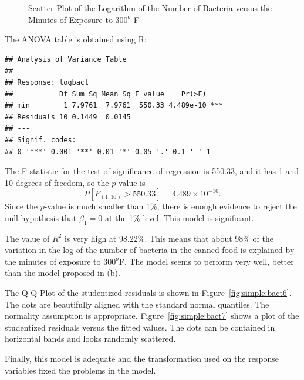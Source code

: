 \begin{solution}{2.22}
\begin{enumerate}
\begin{figure}
\begin{knitrout}
{}



\end{knitrout}
\caption{Scatter Plot of the Logarithm of the Number of Bacteria versus the Minutes of Exposure to $300^{o}$ F}
\label{fig:simple:bact5}
\end{figure}

The ANOVA table is obtained using \textsf{R}:
\begin{knitrout}
\color{fgcolor}\begin{kframe}
\begin{alltt}
\end{alltt}
\begin{verbatim}
## Analysis of Variance Table
##
## Response: logbact
##           Df Sum Sq Mean Sq F value    Pr(>F)
## min        1 7.9761  7.9761  550.33 4.489e-10 ***
## Residuals 10 0.1449  0.0145
## ---
## Signif. codes:
## 0 '***' 0.001 '**' 0.01 '*' 0.05 '.' 0.1 ' ' 1
\end{verbatim}
\end{kframe}
\end{knitrout}

The F-statistic for the test of significance of regression is 550.33, and it has 1 and 10 degrees of freedom, so the $p$-value is $$P[F_{(1,10)}>550.33]= 4.489\times10^{-10}.$$ Since the $p$-value is much smaller than 1\%, there is enough evidence to reject the null hypothesis that $\beta_{1}=0$ at the 1\% level. This model is significant.

The value of $R^{2}$ is very high at $98.22\%$. This means that about 98\% of the variation in the log of the number of bacteria in the canned food is explained by the minutes of exposure to $300^{o}$F. The model seems to perform very well, better than the model proposed in (b).

The Q-Q Plot of the studentized residuals is shown in Figure~\ref{fig:simple:bact6}. The dots are beautifully aligned with the standard normal quantiles. The normality assumption is appropriate. Figure~\ref{fig:simple:bact7} shows a plot of the studentized residuals versus the fitted values. The dots can be contained in horizontal bands and looks randomly scattered.

Finally, this model is adequate and the transformation used on the response variables fixed the problems in the model.

\begin{figure}
\begin{knitrout}
\color{fgcolor}


\end{knitrout}
\end{figure}
\end{enumerate}
\end{solution}

